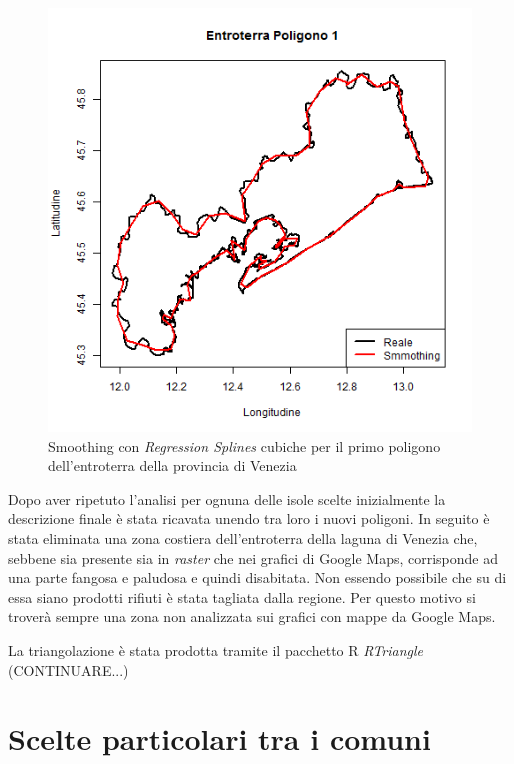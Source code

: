 \documentclass[a4paper,11pt,twoside,openright]{book}							%
\begin{document}
\begin{figure}[!t]
\begin{minipage}{.32\textwidth}
\end{minipage}%
\begin{minipage}{.64\textwidth}
\includegraphics[width=\textwidth]{Immagini/Regione.png}
\end{minipage}
\caption{Smoothing con \textit{Regression Splines} cubiche per il primo poligono dell'entroterra della provincia di Venezia}
\label{fig:smooth_ent_1}
\end{figure}

Dopo aver ripetuto l'analisi per ognuna delle isole scelte inizialmente la descrizione finale è stata ricavata unendo tra loro i nuovi poligoni. In seguito è stata eliminata una zona costiera dell'entroterra della laguna di Venezia che, sebbene sia presente sia in \textit{raster} che nei grafici di Google Maps, corrisponde ad una parte fangosa e paludosa e quindi disabitata. Non essendo possibile che su di essa siano prodotti rifiuti è stata tagliata dalla regione. Per questo motivo si troverà sempre una zona non analizzata sui grafici con mappe da Google Maps.

La triangolazione è stata prodotta tramite il pacchetto R \textit{RTriangle} (CONTINUARE...)


\section{Scelte particolari tra i comuni}
\label{sez:comunireplicati}
\end{document}
